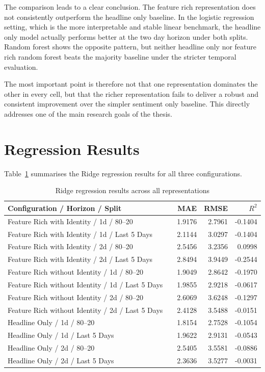 The comparison leads to a clear conclusion. The feature rich representation does not consistently outperform the headline only baseline. In the logistic regression setting, which is the more interpretable and stable linear benchmark, the headline only model actually performs better at the two day horizon under both splits. Random forest shows the opposite pattern, but neither headline only nor feature rich random forest beats the majority baseline under the stricter temporal evaluation.

The most important point is therefore not that one representation dominates the other in every cell, but that the richer representation fails to deliver a robust and consistent improvement over the simpler sentiment only baseline. This directly addresses one of the main research goals of the thesis.


\section{Regression Results}

Table~\ref{tab:regression_results} summarises the Ridge regression results for all three configurations.

\begin{table}[htbp]
\centering
\caption{Ridge regression results across all representations}
\label{tab:regression_results}
\begin{tabular}{llrrr}
\hline
\textbf{Configuration / Horizon / Split} & \textbf{} & \textbf{MAE} & \textbf{RMSE} & \textbf{$R^2$} \\
\hline
Feature Rich with Identity / 1d / 80--20 &  & 1.9176 & 2.7961 & -0.1404 \\
Feature Rich with Identity / 1d / Last 5 Days &  & 2.1144 & 3.0297 & -0.1404 \\
Feature Rich with Identity / 2d / 80--20 &  & 2.5456 & 3.2356 & 0.0998 \\
Feature Rich with Identity / 2d / Last 5 Days &  & 2.8494 & 3.9449 & -0.2544 \\
\hline
Feature Rich without Identity / 1d / 80--20 &  & 1.9049 & 2.8642 & -0.1970 \\
Feature Rich without Identity / 1d / Last 5 Days &  & 1.9855 & 2.9218 & -0.0617 \\
Feature Rich without Identity / 2d / 80--20 &  & 2.6069 & 3.6248 & -0.1297 \\
Feature Rich without Identity / 2d / Last 5 Days &  & 2.4128 & 3.5488 & -0.0151 \\
\hline
Headline Only / 1d / 80--20 &  & 1.8154 & 2.7528 & -0.1054 \\
Headline Only / 1d / Last 5 Days &  & 1.9622 & 2.9131 & -0.0543 \\
Headline Only / 2d / 80--20 &  & 2.5405 & 3.5581 & -0.0886 \\
Headline Only / 2d / Last 5 Days &  & 2.3636 & 3.5277 & -0.0031 \\
\hline
\end{tabular}
\end{table}

